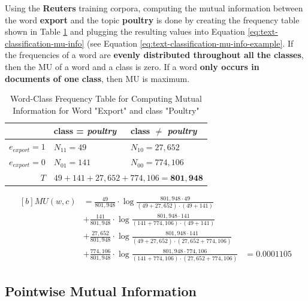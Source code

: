\documentclass{article}
\begin{document}
Using the \textbf{Reuters} training corpora, computing the mutual information between the word \textbf{export} and the topic \textbf{poultry} is done by creating the frequency table shown in Table \ref{tab:example-mu-freq-table} and plugging the resulting values into Equation \ref{eq:text-classification-mu-info} (see Equation \ref{eq:text-classification-mu-info-example}. If the frequencies of a word are \textbf{evenly distributed throughout all the classes}, then the MU of a word and a class is zero. If a word \textbf{only occurs in documents of one class}, then MU is maximum.

\begin{table}[H]
	\centering
	\begin{tabular}{|r|l|l|}
		\hline
		& class = \textit{poultry} & class $\neq$ \textit{poultry} \\
		\hline
		$e_{export} = 1$ & $N_{11} = 49$ & $N_{10} = 27,652$ \\
		$e_{export} = 0$ & $N_{01} = 141$ & $N_{00} = 774,106$ \\
		\hline
		$T$ & \multicolumn{2}{l|}{$49 + 141 + 27,652 + 774,106 = \mathbf{801,948}$}  \\
		\hline
	\end{tabular}
	\caption{Word-Class Frequency Table for Computing Mutual Information for Word "Export" and class "Poultry"}
	\label{tab:example-mu-freq-table}
\end{table}

\begin{equation}
\begin{aligned}[b]
	MU(w, c) &= \frac{49}{801,948} \cdot \log \frac{801,948 \cdot 49 }{(49 + 27,652) \cdot (49 + 141)} \\
	&+ \frac{141}{801,948} \cdot \log \frac{801,948 \cdot 141 }{(141 + 774,106) \cdot (49 + 141)} \\
	&+ \frac{27,652}{801,948} \cdot \log \frac{801,948 \cdot 141 }{(49 + 27,652) \cdot (27,652 + 774,106)} \\
	&+ \frac{774,106}{801,948} \cdot \log \frac{801,948 \cdot 774,106 }{(141 + 774,106) \cdot (27,652 + 774,106)}
	&= 0.0001105
	\label{eq:text-classification-mu-info-example}
\end{aligned}
\end{equation}

\subsection{Pointwise Mutual Information}
\end{document}
